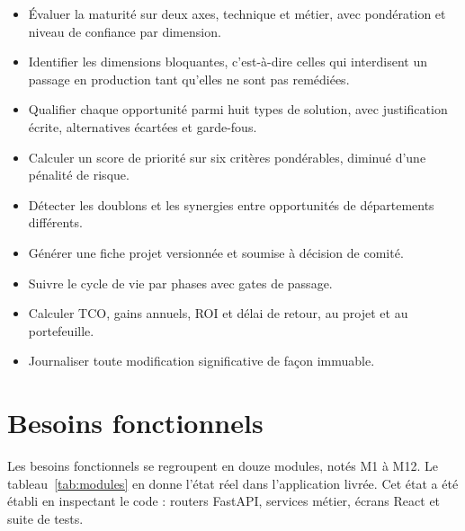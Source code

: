 \begin{itemize}
  \item Évaluer la maturité sur deux axes, technique et métier, avec pondération et
    niveau de confiance par dimension.
  \item Identifier les dimensions bloquantes, c'est-à-dire celles qui interdisent un
    passage en production tant qu'elles ne sont pas remédiées.
  \item Qualifier chaque opportunité parmi huit types de solution, avec justification
    écrite, alternatives écartées et garde-fous.
  \item Calculer un score de priorité sur six critères pondérables, diminué d'une
    pénalité de risque.
  \item Détecter les doublons et les synergies entre opportunités de départements
    différents.
  \item Générer une fiche projet versionnée et soumise à décision de comité.
  \item Suivre le cycle de vie par phases avec gates de passage.
  \item Calculer TCO, gains annuels, ROI et délai de retour, au projet et au
    portefeuille.
  \item Journaliser toute modification significative de façon immuable.
\end{itemize}

\section{Besoins fonctionnels}

Les besoins fonctionnels se regroupent en douze modules, notés M1 à M12. Le
tableau~\ref{tab:modules} en donne l'état réel dans l'application livrée. Cet état a
été établi en inspectant le code : routers FastAPI, services métier, écrans React et
suite de tests.

